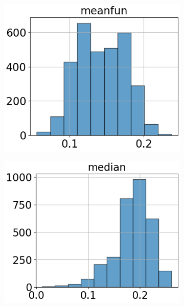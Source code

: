 \begin{figure}[htbp]
\begin{subfigure}[t]{.24\textwidth}
        \centering 
        \includegraphics[width=\linewidth]{../../python_code/plots/logistic_regression/histogram-meanfun.png}
    \end{subfigure}
    \begin{subfigure}[t]{.24\textwidth}
        \centering 
        \includegraphics[width=\linewidth]{../../python_code/plots/logistic_regression/histogram-median.png}
    \end{subfigure}
    \begin{subfigure}[t]{.24\textwidth}
        \centering 

\end{subfigure}
\end{figure}
